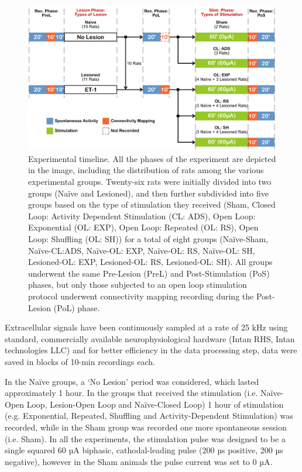 \begin{figure}[htp]
    \begin{center}
    \includegraphics[width=\linewidth]{Figure/Experimental Protocol/Experimental Protocol.jpg}
    \end{center}
    \caption{Experimental timeline. All the phases of the experiment are depicted in the image, including the distribution of rats among the various experimental groups. Twenty-six rats were initially divided into two groups (Naïve and Lesioned), and then further subdivided into five groups based on the type of stimulation they received (Sham, Closed Loop: Activity Dependent Stimulation (CL: ADS), Open Loop: Exponential (OL: EXP), Open Loop: Repeated (OL: RS), Open Loop: Shuffling (OL: SH)) for a total of eight groups (Naïve-Sham, Naïve-CL:ADS, Naïve-OL: EXP, Naïve-OL: RS, Naïve-OL: SH, Lesioned-OL: EXP, Lesioned-OL: RS, Lesioned-OL: SH). All groups underwent the same Pre-Lesion (PreL) and Post-Stimulation (PoS) phases, but only those subjected to an open loop stimulation protocol underwent connectivity mapping recording during the Post-Lesion (PoL) phase.}
    \label{fig:Experimental Protocol}
\end{figure}

Extracellular signals have been continuously sampled at a rate of 25 kHz using standard, commercially available neurophysiological hardware (Intan RHS, Intan technologies LLC) and for better efficiency in the data processing step, data were saved in blocks of 10-min recordings each.

In the Naïve groups, a ‘No Lesion’ period was considered, which lasted approximately 1 hour. In the groups that received the stimulation (i.e. Naïve-Open Loop, Lesion-Open Loop and Naïve-Closed Loop) 1 hour of stimulation (e.g. Exponential, Repeated, Shuffling and Activity-Dependent Stimulation) was recorded, while in the Sham group was recorded one more spontaneous session (i.e. Sham). In all the experiments, the stimulation pulse was designed to be a single squared 60 µA biphasic, cathodal-leading pulse (200 µs positive, 200 µs negative), however in the Sham animals the pulse current was set to 0 µA.

